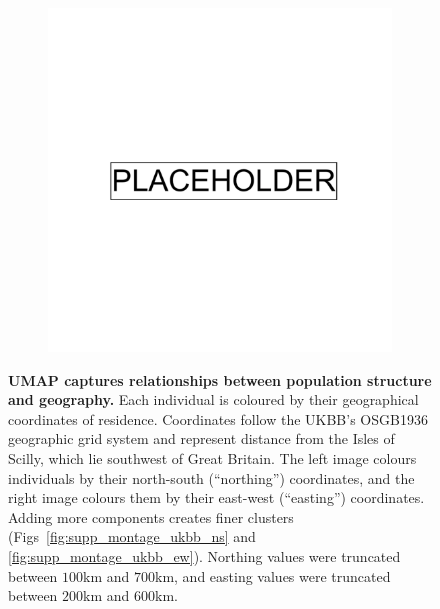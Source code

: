 \clearpage

\begin{figure}
    \centering
    \begin{subfigure}{\columnwidth}
    \includegraphics[width=0.8\columnwidth]{placeholder.png}
    \caption{}
    \label{fig:umap_ukbb_geo_osgb}
    \end{subfigure}
      \caption[UMAP captures relationships between population structure and geography]{\textbf{UMAP captures relationships between population structure and geography.} Each individual is coloured by their geographical coordinates of residence. Coordinates follow the UKBB's OSGB1936 geographic grid system and represent distance from the Isles of Scilly, which lie southwest of Great Britain. The left image colours individuals by their north-south (``northing'') coordinates, and the right image colours them by their east-west (``easting'') coordinates. Adding more components creates finer clusters  (Figs~\ref{fig:supp_montage_ukbb_ns} and \ref{fig:supp_montage_ukbb_ew}). Northing values were truncated between $100$km and $700$km, and easting values were truncated between $200$km and $600$km.}
\label{fig:fig4}
\end{figure}

\clearpage

